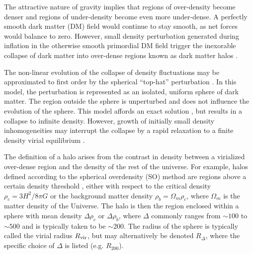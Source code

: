The attractive nature of gravity implies that regions of over-density become denser and regions of under-density become even more under-dense.  A perfectly smooth dark matter (DM) field would continue to stay smooth, as net forces would balance to zero.  However, small density perturbation generated during inflation in the otherwise smooth primordial DM field trigger the inexorable collapse of dark matter into over-dense regions known as dark matter halos \citep{1974ApJ...187..425P, 1986ApJ...304...15B}.

The non-linear evolution of the collapse of density fluctuations may be approximated to first order by the spherical ``top-hat'' perturbation \citep{1968ApJ...151..459S, 1970ApJ...162..815P, 1970AJ.....75...13P, 1972ApJ...176....1G}.  In this model, the perturbation is represented as an isolated, uniform sphere of dark matter.  The region outside the sphere is unperturbed and does not influence the evolution of the sphere.  This model affords an exact solution \citep[][and referencees therein]{1980lssu.book.....P, 1993ppc..book.....P, 1993sfu..book.....P}, but results in a collapse to infinite density.  However, growth of initially small density inhomogeneities may interrupt the collapse by a rapid relaxation to a finite density virial equilibrium \citep[][and references therein]{1999MNRAS.307..203S, 1998FCPh...19..157M}.

The definition of a halo arises from the contrast in density between a virialized over-dense region and the density of the rest of the universe.  For example, halos defined according to the spherical overdensity (SO) method are regions above a certain density threshold \citep{1998ApJ...495...80B}, either with respect to the critical density $\rho_{c} = 3 H^{2} / 8 \pi G$ or the background matter density $\rho_{b} = \Omega_{m} \rho_{c}$, where $\Omega_{m}$ is the matter density of the Universe.  The halo is then the region enclosed within a sphere with mean density $\Delta \rho_{c}$ or $\Delta \rho_{b}$, where $\Delta$ commonly ranges from $\sim 100$ to $\sim 500$ and is typically taken to be $\sim 200$.  The radius of the sphere is typically called the virial radius ${R_{\mathrm{vir}}}$, but may alternatively be denoted $R_{\Delta}$, where the specific choice of $\Delta$ is listed (e.g. $R_{200}$).

